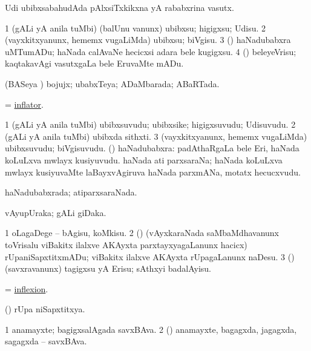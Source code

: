 \bentry
{}
\gl{\nA}
\bmng
Udi ubibxsabahudAda pAlxsiTxkikxna yA rababxrina vasutx. 
\emng
\eentry

\bentry
{}
\gl{\sakirx}
\bmng
\bnum
\num{1} (gALi yA anila tuMbi) (balUnu \mo vanunx) ubibxsu; higigxsu; Udisu. 
\num{2} (vayxkitxyanunx, hememx \mo vugaLiMda) ubibxsu; biVgisu. 
\num{3} (\athaRshA) haNadubabxra uMTumADu; haNada calAvaNe hecicxsi adara bele kugigxsu. 
\num{4} (\athaRshA) beleyeVrisu; kaqtakavAgi vasutxgaLa bele EruvaMte mADu. 
\enum
\emng
\eentry

\bentry
{}
\gl{\gu}
\bmng
(BASeya \vi) bojujx; ubabxTeya; ADaMbarada; ABaRTada. 
\emng
\eentry

\bentry
{}
\gl{\nA}
\bmng
 = \hyperlink{inflator}{inflator}. 
\emng
\eentry

\bentry
{}
\gl{\nA}
\bmng
\bnum
\num{1} (gALi yA anila tuMbi) ubibxsuvudu; ubibxsike; higigxsuvudu; Udisuvudu. 
\num{2} (gALi yA anila tuMbi) ubibxda sithxti. 
\num{3} (vayxkitxyanunx, hememx \mo vugaLiMda) ubibxsuvudu; biVgisuvudu. 
 (\athaRshA) haNadubabxra: 
\banum
{} padAthaRgaLa bele Eri, haNada koLuLxva mwlayx kusiyuvudu. 
 haNada ati parxsaraNa; haNada koLuLxva mwlayx kusiyuvaMte laBayxvAgiruva haNada parxmANa, motatx hecucxvudu. 
\eanum
\numie
\enum
\emng
\eentry

\bentry
{}
\gl{\gu}
\bmng
haNadubabxrada; atiparxsaraNada. 
\emng
\eentry

\bentry
{}
\gl{\nA}
\bmng
vAyupUraka; gALi giDaka. 
\emng
\eentry

\bentry
{}
\gl{\sakirx}
\bmng
\bnum
\num{1} oLagaDege -- bAgisu, koMkisu. 
\num{2} (\vAyx) (vAyxkaraNada saMbaMdhavanunx toVrisalu viBakitx ilalxve AKAyxta parxtayxyagaLanunx hacicx) rUpaniSapxtitxmADu; viBakitx ilalxve AKAyxta rUpagaLanunx naDesu. 
\num{3} (\saM) (savxravanunx) tagigxsu yA Erisu; sAthxyi badalAyisu. 
\enum
\emng
\eentry

\bentry
{}
\gl{\nA}
\bmng
 = \hyperlink{inflexion}{inflexion}. 
\emng
\eentry

\bentry
{}
\gl{\gu}
\bmng
(\vAyx) rUpa niSapxtitxya. 
\emng
\eentry

\bentry
{}
\gl{\nA}
\bmng
\bnum
\num{1} anamayxte; bagigxsalAgada savxBAva. 
\num{2} (\rUpa) anamayxte, bagagxda, jagagxda, sagagxda -- savxBAva. 
\enum
\emng
\eentry

